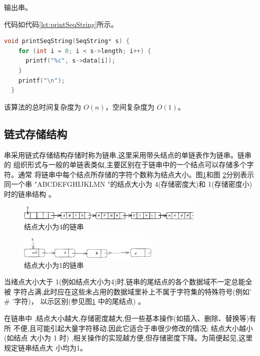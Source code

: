 \documentclass[lang=cn,newtx,10pt,scheme=chinese]{../elegantbook}
\begin{document}
输出串。

代码如代码\ref{lst:printSeqString}所示。

\begin{lstlisting}[language=C++, caption={输出串示例代码}, label={lst:printSeqString}]
  void printSeqString(SeqString* s) {
    for (int i = 0; i < s->length; i++) {
      printf("%c", s->data[i]);
    }
    printf("\n");
  }

\end{lstlisting}

该算法的总时间复杂度为 $O(n)$，空间复杂度为 $O(1)$。



\subsection{链式存储结构}

串采用链式存储结构存储时称为链串,这里采用带头结点的单链表作为链串。链串的
组织形式与一般的单链表类似,主要区别在于链串中的一个结点可以存储多个字符。通常
将链串中每个结点所存储的字符个数称为结点大小。图\ref{fig:linkStr_fourNodes}和图 \ref{fig:linkStr_oneNode}分别表示同一个串
"ABCDEFGHIJKLMN "的结点大小为 4(存储密度大)和 1(存储密度小)时的链串结构 。


\begin{figure}[h]
  \centering
  \includegraphics[width=0.8\textwidth]{./figure/pdf/cropped/linkStr_fourNodes.pdf}
  \caption{结点大小为4的链串}
  \label{fig:linkStr_fourNodes}

\end{figure}

\begin{figure}[h]
  \centering
  \includegraphics[width=0.6\textwidth]{./figure/pdf/cropped/linkStr_oneNode.pdf}
  \caption{结点大小为1的链串}
  \label{fig:linkStr_oneNode}

\end{figure}

当绪点大小大于 1(例如结点大小为4)时,链串的尾结点的各个数据域不一定总能全被
字符占满,此时应在这些未占用的数据域里补上不属于字符集的特殊符号(例如' \# '字符)，
以示区别(参见图\ref{fig:linkStr_fourNodes} 中的尾结点) 。

在链串中 ,结点大小越大,存储密度越大,但一些基本操作(如插入、删除、替换等)有所
不便,且可能引起大量字符移动,因此它适合于串很少修改的情况; 结点大小越小(如结点
大小为 1 时) ,相关操作的实现越方便,但存储密度下降。为简便起见,这里规定链串结点大
小均为1。
\end{document}
